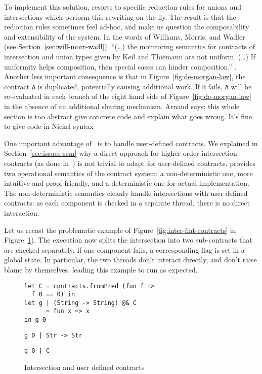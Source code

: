 \documentclass[sigplan,10pt,review,anonymous]{acmart}
\newcommand{\unsure}[2][1=]{}
\newcommand{\resolved}[2]{}
\newcommand{\nickel}[1]{\lstinline[language=nickel]{#1}}
\begin{document}
To implement this solution, \cite{KeilThiemannUnionIntersection} resorts to
specific reduction rules for unions and intersections which perform this
rewriting on the fly. The result is that the reduction rules sometimes feel
ad-hoc, and make us question the composability and extensibility of the system.
In the words of Williams, Morris, and Wadler (see
Section~\ref{sec:will-morr-wadl}): ``(\ldots) the monitoring semantics for
contracts of intersection and union types given by Keil and Thiemann are not
uniform. (\ldots) If uniformity helps composition, then special cases can hinder
composition.'' \cite{RootCauseOfBlame}. Another less important consequence is
that in Figure~\ref{fig:de-morgan-law}, the contract \nickel{A} is duplicated,
potentially causing additional work. If \nickel{B} fails, \nickel{A} will be
re-evaluated in each branch of the right hand side of
Figure~\ref{fig:de-morgan-law} in the absence of an additional sharing
mechanism.
\resolved{(Yann) Does
it also make it less efficient? If $(A \cap B)$ fails because of $B$, their
development causes to recheck the contract $A$ that has been duplicated?}
\unsure{Arnaud says: this whole
section is too abstract give concrete code and explain what goes
wrong. It's fine to give code in Nickel syntax}

One important advantage of~\cite{KeilThiemannUnionIntersection} is to handle
user-defined contracts. We explained in Section~\ref{sec:issues-sem} why a
direct approach for higher-order intersection contracts (as done
in~\cite{RootCauseOfBlame}) is not trivial to adapt for user-defined contracts.
\cite{KeilThiemannUnionIntersection} provides two operational semantics of the
contract system: a non-deterministic one, more intuitive and proof-friendly, and
a deterministic one for actual implementation. The non-deterministic semantics
cleanly handle intersections with user-defined contracts: as each component is
checked in a separate thread, there is no direct interaction.

Let us recast the problematic example of Figure~\ref{fig:inter-flat-contracts}
in Figure~\ref{fig:inter-flat-contracts-2}). The execution now splits the
intersection into two sub-contracts that are checked separately. If one
component fails, a corresponding flag is set in a global state. In particular,
the two threads don't interact directly, and don't raise blame by themselves,
leading this example to run as expected.

\begin{figure}[h]
\begin{lstlisting}[language=nickel,title={Original program}]
let C = contracts.fromPred (fun f =>
  f 0 == 0) in
let g | (String -> String) @& C
      = fun x => x
in g 0
\end{lstlisting}
\begin{lstlisting}[numbers=none,title={First component}]
g 0 | Str -> Str
\end{lstlisting}
\begin{lstlisting}[numbers=none,title={Second component}]
g 0 | C
\end{lstlisting}
\caption{Intersection and user defined contracts}
\label{fig:inter-flat-contracts-2}
\end{figure}
\end{document}
